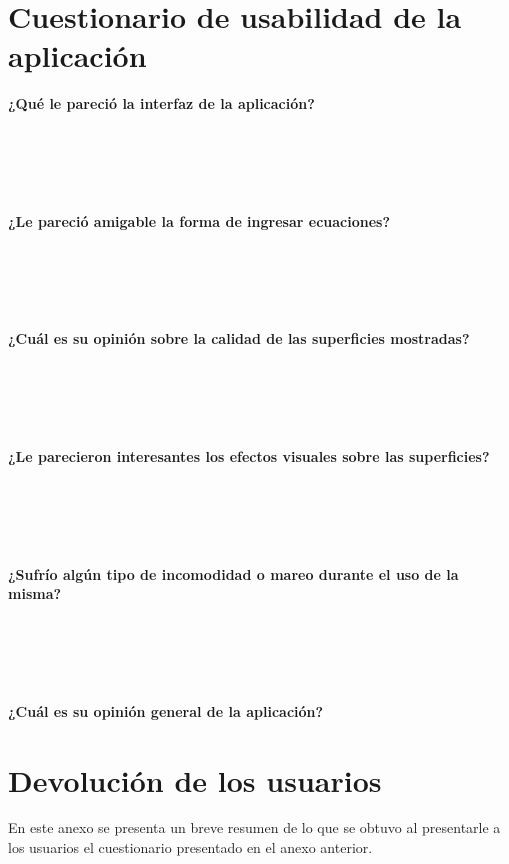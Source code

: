 \documentclass[12pt]{article}
\begin{document}
\clearpage
\section{Cuestionario de usabilidad de la aplicación}
\textbf{¿Qué le pareció la interfaz de la aplicación?}
\\\\\\\\\\\\
\textbf{¿Le pareció  amigable la forma de ingresar ecuaciones?}
\\\\\\\\\\\\
\textbf{¿Cuál es su opinión sobre la calidad de las superficies mostradas?}
\\\\\\\\\\\\
\textbf{¿Le parecieron interesantes los efectos visuales sobre las superficies?}
\\\\\\\\\\\\
\textbf{¿Sufrío algún tipo de incomodidad o mareo durante el uso de la misma?}
\\\\\\\\\\\\
\textbf{¿Cuál es su opinión general de la aplicación?}
\clearpage
\section{Devolución de los usuarios}
En este anexo se presenta un breve resumen de lo que se obtuvo al presentarle a los usuarios el cuestionario presentado en el anexo anterior.
\end{document}
